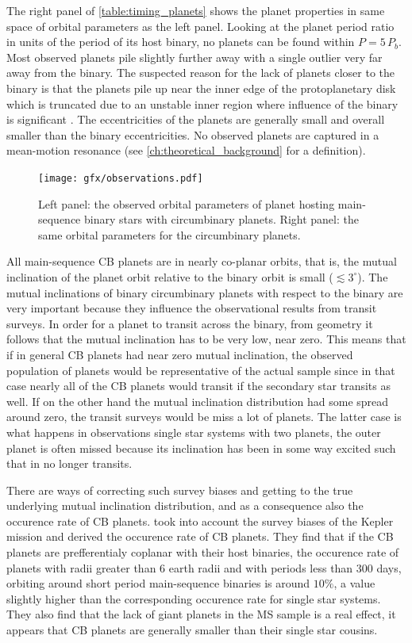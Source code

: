 \documentclass[ twoside,openright,titlepage,numbers=noenddot,headinclude,%
                footinclude=true,cleardoublepage=empty,abstractoff, %
                BCOR=5mm,paper=a4,fontsize=11pt,%
                american,%
                ]{scrreprt}
\begin{document}
The right panel of \cref{table:timing_planets} shows the planet properties 
in same space of orbital parameters as the left panel. 
Looking at the planet period ratio in units of the
period of its host binary, no planets can be found within $P=5\,P_b$. Most 
observed planets pile slightly further away with a single outlier very far 
away from the binary. The suspected reason for the lack of planets closer
to the binary is that the planets pile up near the inner edge of the 
protoplanetary disk which is truncated due to an unstable inner region
where influence of the binary is significant \citep{nelson2007}. The 
eccentricities of the planets are generally small and overall smaller than
the binary eccentricities. No observed planets are captured 
in a mean-motion resonance
(see \cref{ch:theoretical_background} for a definition).
\begin{figure}[htb]
\centering
\texttt{[image: gfx/observations.pdf]}
\caption{Left panel: the observed orbital parameters 
    of planet hosting main-sequence binary stars with 
    circumbinary planets. Right panel: the same orbital parameters for the 
    circumbinary planets.}
\label{fig:observations}
\end{figure}

All main-sequence CB planets are in nearly co-planar orbits, that is,
the mutual inclination of the planet orbit relative to the binary orbit is 
small ($\lesssim 3^{\circ}$).  The mutual inclinations of binary circumbinary 
planets with respect to the binary are very important because they influence
the observational results from transit surveys. In order for a planet to
transit across the binary, from geometry it follows that the mutual inclination
has to be very low, near zero. This means that if in general CB planets had
near zero mutual inclination, the observed population of planets would be
representative of the actual sample since in that case nearly all of the
CB planets would transit if the secondary star transits as well. If
on the other hand the mutual inclination distribution had some spread around
zero, the transit surveys would be miss a lot of planets. The latter case
is what happens in observations single star systems with two planets, the
outer planet is often missed because its inclination has been in some way
excited such that in no longer transits.

There are ways of correcting such survey biases and getting to the true 
underlying mutual inclination distribution, and as a consequence also the
occurence rate of CB planets. \cite{Armstrong2014} took into account the 
survey biases of the Kepler mission and derived the occurence rate of CB
planets. They find that if the CB planets are prefferentialy coplanar
with their host binaries, the occurence rate of planets with radii greater
than 6 earth radii and with periods less than 300 days, orbiting around
short period main-sequence binaries is around $10\%$, a value slightly 
higher than 
the corresponding occurence rate for single star systems. They also
find that the lack of giant planets in the MS sample is a real effect,
it appears that CB planets are generally smaller than their
single star cousins.
\end{document}
